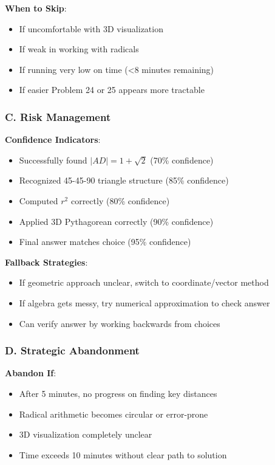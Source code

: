\documentclass[12pt]{article}
\begin{document}
\begin{competitionbox}
\textbf{When to Skip}:
\begin{itemize}
    \item If uncomfortable with 3D visualization
    \item If weak in working with radicals
    \item If running very low on time (<8 minutes remaining)
    \item If easier Problem 24 or 25 appears more tractable
\end{itemize}

\subsubsection*{C. Risk Management}

\textbf{Confidence Indicators}:
\begin{itemize}
    \item Successfully found $|AD| = 1 + \sqrt{2}$ (70\% confidence)
    \item Recognized 45-45-90 triangle structure (85\% confidence)
    \item Computed $r^2$ correctly (80\% confidence)
    \item Applied 3D Pythagorean correctly (90\% confidence)
    \item Final answer matches choice (95\% confidence)
\end{itemize}

\textbf{Fallback Strategies}:
\begin{itemize}
    \item If geometric approach unclear, switch to coordinate/vector method
    \item If algebra gets messy, try numerical approximation to check answer
    \item Can verify answer by working backwards from choices
\end{itemize}

\subsubsection*{D. Strategic Abandonment}

\textbf{Abandon If}:
\begin{itemize}
    \item After 5 minutes, no progress on finding key distances
    \item Radical arithmetic becomes circular or error-prone
    \item 3D visualization completely unclear
    \item Time exceeds 10 minutes without clear path to solution
\end{itemize}


\end{competitionbox}
\end{document}
